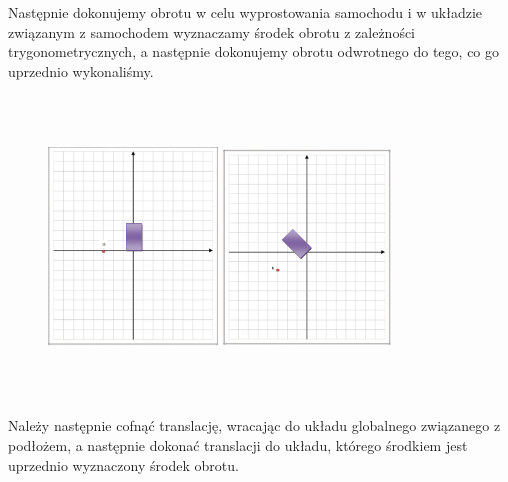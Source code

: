 \documentclass[a4paper, 12pt]{report}
\begin{document}
			\noindent Następnie dokonujemy obrotu w celu wyprostowania samochodu i w układzie związanym \linebreak z samochodem wyznaczamy środek obrotu z zależności trygonometrycznych, a następnie dokonujemy obrotu odwrotnego do tego, co go uprzednio wykonaliśmy.
			\begin{figure}[H]
				\centering
				\includegraphics[height=8cm, width=0.4\textwidth]{./img/3.png}
				\includegraphics[height=8cm, width=0.4\textwidth]{./img/4.png}
			\end{figure}
			\noindent Należy następnie cofnąć translację, wracając do układu globalnego związanego z podłożem, a następnie dokonać translacji do układu, którego środkiem jest uprzednio wyznaczony środek obrotu.
\end{document}
